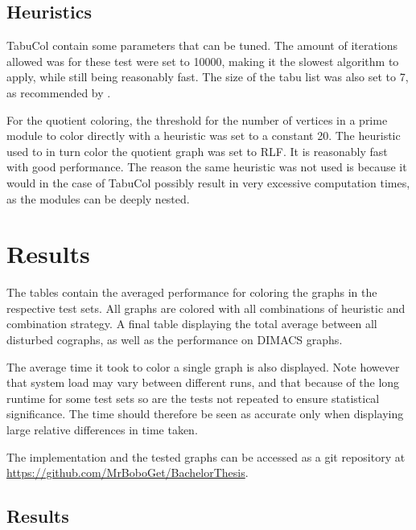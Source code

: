 \documentclass[a4paper]{article}
\begin{document}
\subsection{Heuristics}
TabuCol contain some parameters that can be tuned. The amount of
iterations allowed was for these test were set to 10000, making it the slowest
algorithm to apply, while still being reasonably fast. The size of the tabu list 
was also set to 7, as recommended by \cite{1990}.

For the quotient coloring, the threshold for the number of vertices in a prime
module to color directly with a heuristic was set to a constant 20. The
heuristic used to in turn color the quotient graph was set to RLF. It is
reasonably fast with good performance. The reason the same heuristic was not
used is because it would in the case of TabuCol possibly result in very
excessive computation times, as the modules can be deeply nested.

\section{Results}
\label{sec:Result}
The tables contain the averaged performance for coloring the graphs in the
respective test sets. All graphs are colored with all combinations of heuristic
and combination strategy. A final table displaying the total average between all
disturbed cographs, as well as the performance on DIMACS graphs.

The average time it took to color a single graph is also displayed. Note
however that system load may vary between different runs, and that because of
the long runtime for some test sets so are the tests not repeated to ensure
statistical significance. The time should therefore be seen as accurate only
when displaying large relative differences in time taken.

The implementation and the tested graphs can be accessed as a git repository 
at \url{https://github.com/MrBoboGet/BachelorThesis}.

\subsection{Results}
\newpage
\end{document}
